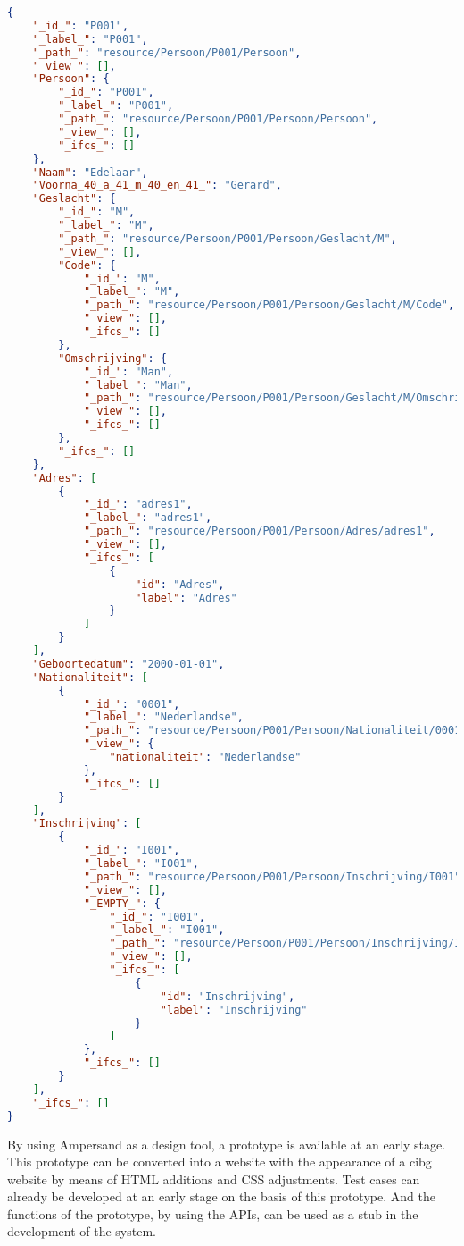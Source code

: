 \begin{lstlisting}[language=json,firstnumber=1,caption={Postman output from GET Person},captionpos=b,label={list:postman-output}]
{
    "_id_": "P001",
    "_label_": "P001",
    "_path_": "resource/Persoon/P001/Persoon",
    "_view_": [],
    "Persoon": {
        "_id_": "P001",
        "_label_": "P001",
        "_path_": "resource/Persoon/P001/Persoon/Persoon",
        "_view_": [],
        "_ifcs_": []
    },
    "Naam": "Edelaar",
    "Voorna_40_a_41_m_40_en_41_": "Gerard",
    "Geslacht": {
        "_id_": "M",
        "_label_": "M",
        "_path_": "resource/Persoon/P001/Persoon/Geslacht/M",
        "_view_": [],
        "Code": {
            "_id_": "M",
            "_label_": "M",
            "_path_": "resource/Persoon/P001/Persoon/Geslacht/M/Code",
            "_view_": [],
            "_ifcs_": []
        },
        "Omschrijving": {
            "_id_": "Man",
            "_label_": "Man",
            "_path_": "resource/Persoon/P001/Persoon/Geslacht/M/Omschrijving/Man",
            "_view_": [],
            "_ifcs_": []
        },
        "_ifcs_": []
    },
    "Adres": [
        {
            "_id_": "adres1",
            "_label_": "adres1",
            "_path_": "resource/Persoon/P001/Persoon/Adres/adres1",
            "_view_": [],
            "_ifcs_": [
                {
                    "id": "Adres",
                    "label": "Adres"
                }
            ]
        }
    ],
    "Geboortedatum": "2000-01-01",
    "Nationaliteit": [
        {
            "_id_": "0001",
            "_label_": "Nederlandse",
            "_path_": "resource/Persoon/P001/Persoon/Nationaliteit/0001",
            "_view_": {
                "nationaliteit": "Nederlandse"
            },
            "_ifcs_": []
        }
    ],
    "Inschrijving": [
        {
            "_id_": "I001",
            "_label_": "I001",
            "_path_": "resource/Persoon/P001/Persoon/Inschrijving/I001",
            "_view_": [],
            "_EMPTY_": {
                "_id_": "I001",
                "_label_": "I001",
                "_path_": "resource/Persoon/P001/Persoon/Inschrijving/I001/_EMPTY_",
                "_view_": [],
                "_ifcs_": [
                    {
                        "id": "Inschrijving",
                        "label": "Inschrijving"
                    }
                ]
            },
            "_ifcs_": []
        }
    ],
    "_ifcs_": []
}
\end{lstlisting}

By using Ampersand as a design tool, a prototype is available at an early stage.
This prototype can be converted into a website with the appearance of a \acrshort{cibg} website by means of HTML additions and CSS adjustments.
Test cases can already be developed at an early stage on the basis of this prototype.
And the functions of the prototype, by using the APIs, can be used as a stub in the development of the system.

